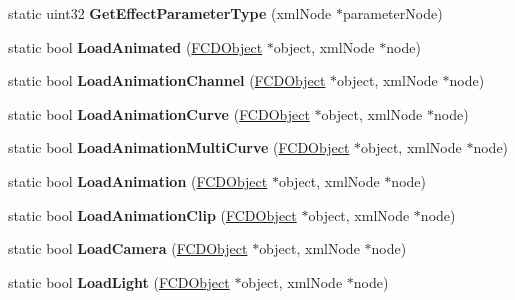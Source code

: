 \begin{DoxyCompactItemize}
\item 
\hypertarget{classFArchiveXML_aef32fcbf50e0217463fdb5aa244b0c0b}{
static uint32 {\bfseries GetEffectParameterType} (xmlNode $\ast$parameterNode)}
\label{classFArchiveXML_aef32fcbf50e0217463fdb5aa244b0c0b}

\item 
\hypertarget{classFArchiveXML_ab90611d72d439141c2afa67bdb608775}{
static bool {\bfseries LoadAnimated} (\hyperlink{classFCDObject}{FCDObject} $\ast$object, xmlNode $\ast$node)}
\label{classFArchiveXML_ab90611d72d439141c2afa67bdb608775}

\item 
\hypertarget{classFArchiveXML_a11076b3abe8bab3edeb99630d6db1238}{
static bool {\bfseries LoadAnimationChannel} (\hyperlink{classFCDObject}{FCDObject} $\ast$object, xmlNode $\ast$node)}
\label{classFArchiveXML_a11076b3abe8bab3edeb99630d6db1238}

\item 
\hypertarget{classFArchiveXML_a9314af33577fe249ec39ccb42d5c059d}{
static bool {\bfseries LoadAnimationCurve} (\hyperlink{classFCDObject}{FCDObject} $\ast$object, xmlNode $\ast$node)}
\label{classFArchiveXML_a9314af33577fe249ec39ccb42d5c059d}

\item 
\hypertarget{classFArchiveXML_a80ab0a3010b7723624892e7006201951}{
static bool {\bfseries LoadAnimationMultiCurve} (\hyperlink{classFCDObject}{FCDObject} $\ast$object, xmlNode $\ast$node)}
\label{classFArchiveXML_a80ab0a3010b7723624892e7006201951}

\item 
\hypertarget{classFArchiveXML_a1556e23523434a156d05927399317f75}{
static bool {\bfseries LoadAnimation} (\hyperlink{classFCDObject}{FCDObject} $\ast$object, xmlNode $\ast$node)}
\label{classFArchiveXML_a1556e23523434a156d05927399317f75}

\item 
\hypertarget{classFArchiveXML_a8059e941d148962985a842ec7fc4ab9d}{
static bool {\bfseries LoadAnimationClip} (\hyperlink{classFCDObject}{FCDObject} $\ast$object, xmlNode $\ast$node)}
\label{classFArchiveXML_a8059e941d148962985a842ec7fc4ab9d}

\item 
\hypertarget{classFArchiveXML_a7ca2c2a7c5b93049947ff855936e2036}{
static bool {\bfseries LoadCamera} (\hyperlink{classFCDObject}{FCDObject} $\ast$object, xmlNode $\ast$node)}
\label{classFArchiveXML_a7ca2c2a7c5b93049947ff855936e2036}

\item 
\hypertarget{classFArchiveXML_a0cfda9575a465a13ffe357491e622cce}{
static bool {\bfseries LoadLight} (\hyperlink{classFCDObject}{FCDObject} $\ast$object, xmlNode $\ast$node)}
\label{classFArchiveXML_a0cfda9575a465a13ffe357491e622cce}


\end{DoxyCompactItemize}
